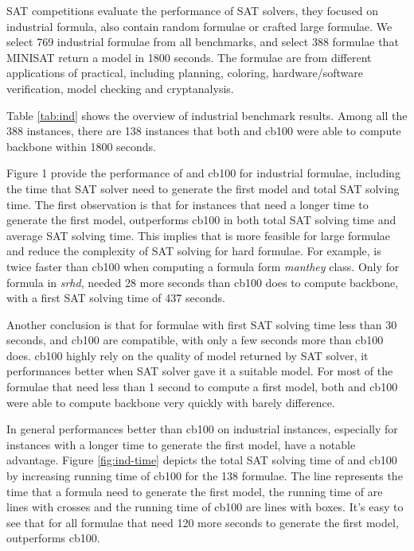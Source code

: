 SAT competitions evaluate the performance of SAT solvers, they focused on industrial formula, also contain random formulae or crafted large formulae. We select 769 industrial formulae from all benchmarks, and select 388 formulae that MINISAT return a model in 1800 seconds. The formulae are from different applications of practical, including planning, coloring, hardware/software verification, model checking and cryptanalysis.

Table \ref{tab:ind} shows the overview of industrial benchmark results. Among all the 388 instances, there are 138 instances that both \tool and cb100 were able to compute backbone within 1800 seconds.

Figure 1 provide the performance of \tool and cb100 for industrial formulae, including the time that SAT solver need to generate the first model and total SAT solving time. The first observation is that for instances that need a longer time to generate the first model, \tool outperforms cb100 in both total SAT solving time and average SAT solving time. This implies that \tool is more feasible for large formulae and reduce the complexity of SAT solving for hard formulae. For example, \tool is twice faster than cb100 when computing a formula form \emph{manthey} class. Only for formula in \emph{srhd}, \tool needed 28 more seconds than cb100 does to compute backbone, with a first SAT solving time of 437 seconds.

Another conclusion is that for formulae with first SAT solving time less than 30 seconds, \tool and cb100 are compatible, with only a few seconds more than cb100 does. cb100 highly rely on the quality of model returned by SAT solver, it performances better when SAT solver gave it a suitable model. For most of the formulae that need less than 1 second to compute a first model, both \tool and cb100 were able to compute backbone very quickly with barely difference.

In general \tool performances better than cb100 on industrial instances, especially for instances with a longer time to generate the first model, \tool have a notable advantage. Figure \ref{fig:ind-time} depicts the total SAT solving time of \tool and cb100 by increasing running time of cb100 for the 138 formulae. The line represents the time that a formula need to generate the first model, the running time of \tool are lines with crosses and the running time of cb100 are lines with boxes. It's easy to see that for all formulae that need 120 more seconds to generate the first model, \tool outperforms cb100.

